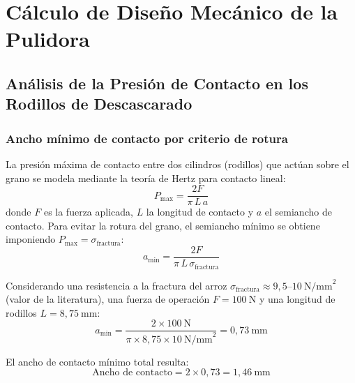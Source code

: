 
\section{Cálculo de Diseño Mecánico de la Pulidora}

\subsection{Análisis de la Presión de Contacto en los Rodillos de Descascarado}

\subsubsection{Ancho mínimo de contacto por criterio de rotura}
La presión máxima de contacto entre dos cilindros (rodillos) que actúan sobre el grano se modela mediante la teoría de Hertz para contacto lineal:
\begin{equation}
P_{\max} = \frac{2F}{\pi\, L\, a}
\label{eq:pmax}
\end{equation}
\noindent donde $F$ es la fuerza aplicada, $L$ la longitud de contacto y $a$ el semiancho de contacto. Para evitar la rotura del grano, el semiancho mínimo se obtiene imponiendo $P_{\max}=\sigma_{\text{fractura}}$:
\begin{equation}
a_{\min} = \frac{2F}{\pi\, L\, \sigma_{\text{fractura}}}
\label{eq:amin}
\end{equation}

Considerando una resistencia a la fractura del arroz $\sigma_{\text{fractura}} \approx 9{,}5$--$10\ \text{N/mm}^{2}$ (valor de la literatura), una fuerza de operación $F = 100\ \text{N}$ y una longitud de rodillos $L = 8{,}75\ \text{mm}$:
\begin{equation}
a_{\min} = \frac{2 \times 100\ \text{N}}{\pi \times 8{,}75 \times 10\ \text{N/mm}^{2}} = 0{,}73\ \text{mm}
\end{equation}

El ancho de contacto mínimo total resulta:
\begin{equation}
\text{Ancho de contacto} = 2 \times 0{,}73 = 1{,}46\ \text{mm}
\end{equation}

